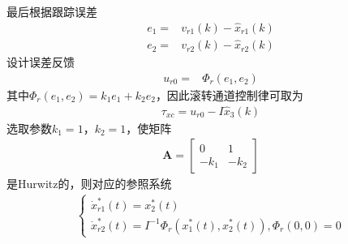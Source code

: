 最后根据跟踪误差
\begin{align}
e_{1} =& v_{r1}(k)-\hat{x}_{r1}(k) \\
e_{2} =& v_{r2}(k)-\hat{x}_{r2}(k)
\end{align}
设计误差反馈
\begin{align}
u_{r0} =& \Phi_r (e_1,e_2)	\label{NLSEF}
\end{align}
其中$\Phi_r (e_1,e_2)= k_{1} e_{1}+k_{2} e_{2} $，因此滚转通道控制律可取为
\begin{align}
\tau_{xc} = u_{r0} -I\hat{x}_{3}(k)	\label{eq_roll_cl}
\end{align}
选取参数$ k_{1}=1 $，$ k_{2}=1 $，使矩阵
\begin{align}
\bm{A}=\begin{bmatrix}
0 & 1 \\
-k_{1} & -k_{2}
\end{bmatrix}
\end{align}
是Hurwitz的，则对应的参照系统
\begin{align}\left\{\begin{array}{l}
\dot{x}_{r1}^{*}(t)=x_{2}^{*}(t) \\
\dot{x}_{r2}^{*}(t)=I^{-1} \Phi_r\left(x_{1}^{*}(t), x_{2}^{*}(t)\right), \Phi_r(0,0)=0
\end{array}\right.	\label{eq_sec_ref_sys}
\end{align}
